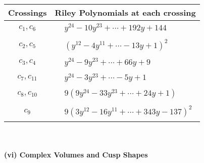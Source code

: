 \documentclass[1p]{elsarticle_modified}
\theoremstyle{definition}
\begin{document}
\begin{tabular}{m{50pt}|m{274pt}}
Crossings & \hspace{64pt}Riley Polynomials at each crossing \\
\hline $$\begin{aligned}c_{1},c_{6}\end{aligned}$$&$\begin{aligned}
&y^{24}-10 y^{23}+\cdots+192 y+144
\end{aligned}$\\
\hline $$\begin{aligned}c_{2},c_{5}\end{aligned}$$&$\begin{aligned}
&(y^{12}-4 y^{11}+\cdots-13 y+1)^{2}
\end{aligned}$\\
\hline $$\begin{aligned}c_{3},c_{4}\end{aligned}$$&$\begin{aligned}
&y^{24}-9 y^{23}+\cdots+66 y+9
\end{aligned}$\\
\hline $$\begin{aligned}c_{7},c_{11}\end{aligned}$$&$\begin{aligned}
&y^{24}-3 y^{23}+\cdots-5 y+1
\end{aligned}$\\
\hline $$\begin{aligned}c_{8},c_{10}\end{aligned}$$&$\begin{aligned}
&9(9 y^{24}-33 y^{23}+\cdots+24 y+1)
\end{aligned}$\\
\hline $$\begin{aligned}c_{9}\end{aligned}$$&$\begin{aligned}
&9(3 y^{12}-16 y^{11}+\cdots+343 y-137)^{2}
\end{aligned}$\\
\hline
\end{tabular}\\~\\
\newpage\flushleft \textbf{(vi) Complex Volumes and Cusp Shapes}
\end{document}
